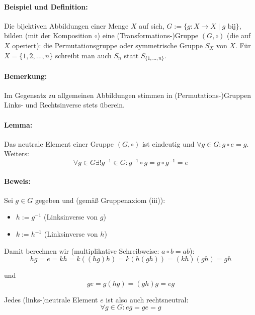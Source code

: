 \paragraph{Beispiel und Definition:}
	Die bijektiven Abbildungen einer Menge $X$ auf sich, $G:= \{g:X\to X\mid g \text{ bij}\}$, bilden (mit der Komposition $\circ$) eine (Transformations-)Gruppe $(G,\circ )$ (die auf $X$ operiert): die Permutationsgruppe oder symmetrische Gruppe $S_X$ von $X$. Für $X=\{1,2,...,n\}$ schreibt man auch $S_n$ statt $S_{\{1,...,n\}}$.
\paragraph{Bemerkung:}
	Im Gegensatz zu allgemeinen Abbildungen stimmen in (Permutations-)Gruppen Links- und Rechtsinverse stets überein.
\paragraph{Lemma:}
	Das neutrale Element einer Gruppe $(G,\circ )$ ist eindeutig und $\forall g\in G: g\circ e = g$. Weiters: 
	\begin{equation*}
		\forall g\in G \exists ! g^{-1} \in G: g^{-1}\circ g = g \circ g^{-1} = e
	\end{equation*}

\paragraph{Beweis:}
	Sei $g\in G$ gegeben und (gemäß Gruppenaxiom (iii)):
	\begin{itemize}
		\item $h:= g^{-1}$ (Linksinverse von $g$)
		\item $k:= h^{-1}$ (Linksinverse von $h$)
	\end{itemize}
	
	Damit berechnen wir (multiplikative Schreibweise: $a\circ b = ab$):
	\begin{equation*}
		hg = e = kh = k((hg)h) = k(h(gh)) = (kh)(gh) = gh
	\end{equation*}
	
	und
	\begin{equation*}
		ge = g(hg) = (gh)g = eg
	\end{equation*}
	
	Jedes (links-)neutrale Element $e$ ist also auch rechtsneutral:
	\begin{equation*}
		\forall g\in G: eg = ge = g
	\end{equation*}
	
